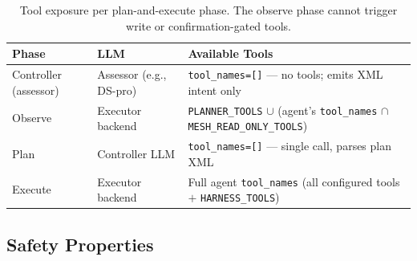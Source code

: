 \documentclass[11pt,a4paper]{article}
\newcommand{\code}[1]{\texttt{#1}}
\begin{document}
\begin{table}[h]
\centering
\small
\begin{tabular}{@{}llL{6cm}@{}}
\toprule
\textbf{Phase} & \textbf{LLM} & \textbf{Available Tools} \\
\midrule
Controller (assessor)
  & Assessor (e.g., DS-pro)
  & \code{tool\_names=[]} --- no tools; emits XML intent only \\
\addlinespace
Observe
  & Executor backend
  & \code{PLANNER\_TOOLS} $\cup$
    (agent's \code{tool\_names} $\cap$
    \code{MESH\_READ\_ONLY\_TOOLS}) \\
\addlinespace
Plan
  & Controller LLM
  & \code{tool\_names=[]} --- single call, parses plan XML \\
\addlinespace
Execute
  & Executor backend
  & Full agent \code{tool\_names}
    (all configured tools $+$ \code{HARNESS\_TOOLS}) \\
\bottomrule
\end{tabular}
\caption{Tool exposure per plan-and-execute phase. The observe phase
cannot trigger write or confirmation-gated tools.}
\label{tab:phase-tools}
\end{table}

\subsection{Safety Properties}
\end{document}
